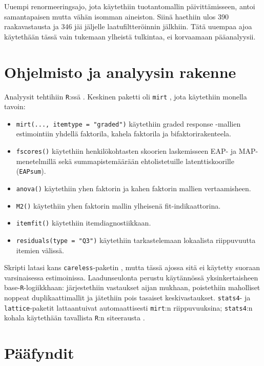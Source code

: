 \documentclass[11pt,a4paper]{article}
\begin{document}
Uuempi renormeeringsajo, jota käytethiin tuotantomallin päivittämisseen, antoi samantapaisen mutta vähän isomman aineiston. Siinä haethiin ulos 390 raakavastausta ja 346 jäi jäljelle laatufiltteröinnin jälkhiin. Tätä uuempaa ajoa käytethään tässä vain tukemaan ylheistä tulkintaa, ei korvaamaan pääanalyysii.

\section{Ohjelmisto ja analyysin rakenne}
Analyysit tehtihiin \texttt{R}:ssä \parencite{RCore2026}. Keskinen paketti oli \texttt{mirt} \parencite{Chalmers2012mirt}, jota käytethiin monella tavoin:

\begin{itemize}
\item \texttt{mirt(..., itemtype = "graded")} käytethiin graded response -mallien estimointiin yhdellä faktorila, kahela faktorila ja bifaktorirakenteela.
\item \texttt{fscores()} käytethiin henkilökohtasten skoorien laskemisseen EAP- ja MAP-menetelmillä sekä summapistemäärään ehtolistetuille latenttiskoorille (\texttt{EAPsum}).
\item \texttt{anova()} käytethiin yhen faktorin ja kahen faktorin mallien vertaamisheen.
\item \texttt{M2()} käytethiin yhen faktorin mallin ylheisenä fit-indikaattorina.
\item \texttt{itemfit()} käytethiin itemdiagnostiikkaan.
\item \texttt{residuals(type = "Q3")} käytethiin tarkastelemaan lokaalista riippuvuutta itemien välissä.
\end{itemize}

Skripti latasi kans \texttt{careless}-paketin \parencite{YentesWilhelm2023careless}, mutta tässä ajossa sitä ei käytetty suoraan varsinaisessa estimoinissa. Laadunseulonta perustu käytännössä yksinkertaisheen base-\texttt{R}-logiikkhaan: järjestethiin vastaukset aijan mukhaan, poistethiin maholliset noppeat duplikaattimallit ja jätethiin pois tasaiset keskivastaukset. \texttt{stats4}- ja \texttt{lattice}-paketit \parencite{Sarkar2008lattice} lattaantuivat automaattisesti \texttt{mirt}:n riippuvuuksina; \texttt{stats4}:n kohala käytethään tavallista \texttt{R}:n siteerausta \parencite{RCore2026}.

\section{Pääfyndit}
\end{document}
